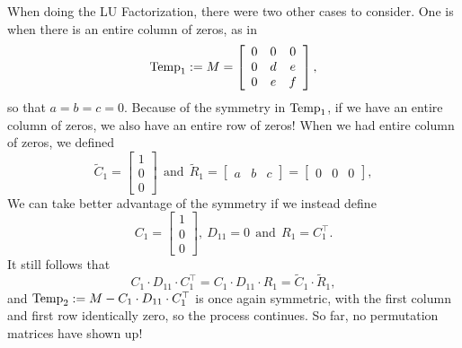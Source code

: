 When doing the LU Factorization, there were two other cases to consider. One is when there is an entire column of zeros, as in 
\begin{equation}
    \label{eq:SymmetricM_Step2}
  {\rm Temp}_{1}:= M= \left[\begin{array}{ccc} 
   0 & 0 & 0\\
   0 & d & e\\
   0 & e & f
   \end{array}\right],
\end{equation}
so that $a=b=c=0$. Because of the symmetry in ${\rm Temp}_{1}$, if we have an entire column of zeros, we also have an entire row of zeros! When we had entire column of zeros, we defined
\begin{equation}
    \label{eq:SymmetricM_LUStep2a}
   \tilde{C}_1= \left[\begin{array}{c} 
   1 \\  0 \\ 0 
   \end{array}\right] ~~\text{and}~~\tilde{R}_1=\left[\begin{array}{ccc}
   a & b & c
   \end{array}\right]= \left[\begin{array}{ccc}
   0 & 0 & 0
   \end{array}\right],
\end{equation}
We can take better advantage of the symmetry if we instead  define
\begin{equation}
    \label{eq:SymmetricM_LUStep2b}
   C_1= \left[\begin{array}{c} 
   1 \\  0 \\ 0
   \end{array}\right], ~D_{11}=0~~\text{and}~~R_1=C_1^\top.
\end{equation}
It still follows that
\begin{equation}
    \label{eq:SymmetricM_LUStep2c}
   C_1 \cdot D_{11} \cdot C_1^\top = C_1 \cdot D_{11} \cdot R_1 = \tilde{C}_1 \cdot \tilde{R}_1,
\end{equation}
and ${\rm Temp}_{2} := M -C_1 \cdot D_{11} \cdot C_1^\top$ is once again symmetric, with the first column and first row identically zero, so the process continues. So far, no permutation matrices have shown up!\\

